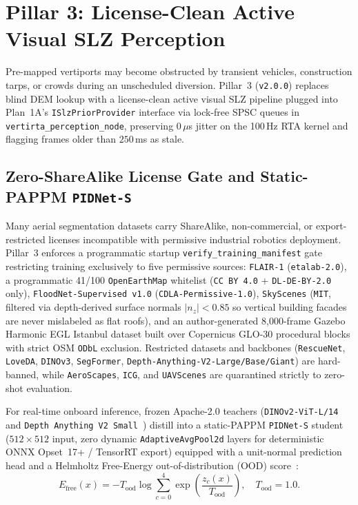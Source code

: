\documentclass[conference,10pt]{IEEEtran}
\begin{document}
\section{Pillar 3: License-Clean Active Visual SLZ Perception}
\label{sec:pillar3}

Pre-mapped vertiports may become obstructed by transient vehicles, construction tarps, or crowds during an unscheduled diversion. Pillar~3 (\texttt{v2.0.0}) replaces blind DEM lookup with a license-clean active visual SLZ pipeline plugged into Plan~1A's \texttt{ISlzPriorProvider} interface via lock-free SPSC queues in \texttt{vertirta\_perception\_node}, preserving $0\,\mu$s jitter on the 100\,Hz RTA kernel and flagging frames older than $250$\,ms as stale.

\subsection{Zero-ShareAlike License Gate and Static-PAPPM \texttt{PIDNet-S}}

Many aerial segmentation datasets carry ShareAlike, non-commercial, or export-restricted licenses incompatible with permissive industrial robotics deployment. Pillar~3 enforces a programmatic startup \texttt{verify\_training\_manifest} gate restricting training exclusively to five permissive sources: \texttt{FLAIR-1} (\texttt{etalab-2.0}), a programmatic 41/100 \texttt{OpenEarthMap} whitelist (\texttt{CC~BY~4.0} + \texttt{DL-DE-BY-2.0} only), \texttt{FloodNet-Supervised v1.0} (\texttt{CDLA-Permissive-1.0}), \texttt{SkyScenes} (\texttt{MIT}, filtered via depth-derived surface normals $|n_z|<0.85$ so vertical building facades are never mislabeled as flat roofs), and an author-generated 8{,}000-frame Gazebo Harmonic EGL Istanbul dataset built over Copernicus GLO-30 procedural blocks with strict OSM \texttt{ODbL} exclusion. Restricted datasets and backbones (\texttt{RescueNet}, \texttt{LoveDA}, \texttt{DINOv3}, \texttt{SegFormer}, \texttt{Depth-Anything-V2-Large/Base/Giant}) are hard-banned, while \texttt{AeroScapes}, \texttt{ICG}, and \texttt{UAVScenes} are quarantined strictly to zero-shot evaluation.

For real-time onboard inference, frozen Apache-2.0 teachers (\texttt{DINOv2-ViT-L/14}~\cite{oquab_dinov2_2024} and \texttt{Depth Anything V2 Small}~\cite{yang_depthanythingv2_2024}) distill into a static-PAPPM \texttt{PIDNet-S} student~\cite{xu_pidnet_2023} ($512\times 512$ input, zero dynamic \texttt{AdaptiveAvgPool2d} layers for deterministic ONNX Opset~17+ / TensorRT export) equipped with a unit-normal prediction head and a Helmholtz Free-Energy out-of-distribution (OOD) score~\cite{liu_energy_ood_2020}:
\begin{equation}
  E_{\text{free}}(x) = -T_{\text{ood}}\log\sum_{c=0}^{4}\exp\!\left(\frac{z_c(x)}{T_{\text{ood}}}\right), \quad T_{\text{ood}}=1.0.
  \label{eq:free_energy}
\end{equation}
\end{document}
